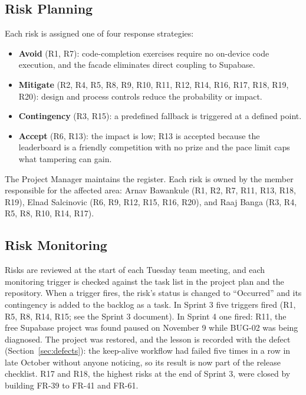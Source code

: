 \documentclass[12pt,letterpaper]{article}
\begin{document}
\subsection{Risk Planning}
Each risk is assigned one of four response strategies:
\begin{itemize}
  \item \textbf{Avoid} (R1, R7): code-completion exercises require no on-device code
        execution, and the facade eliminates direct coupling to Supabase.
  \item \textbf{Mitigate} (R2, R4, R5, R8, R9, R10, R11, R12, R14, R16, R17, R18, R19,
        R20): design and process controls reduce the probability or impact.
  \item \textbf{Contingency} (R3, R15): a predefined fallback is triggered at a
        defined point.
  \item \textbf{Accept} (R6, R13): the impact is low; R13 is accepted because the
        leaderboard is a friendly competition with no prize and the pace limit caps
        what tampering can gain.
\end{itemize}
The Project Manager maintains the register. Each risk is owned by the member
responsible for the affected area: Arnav Bawankule (R1, R2, R7, R11, R13, R18, R19), Elnad
Salcinovic (R6, R9, R12, R15, R16, R20), and Raaj Banga (R3, R4, R5, R8, R10, R14, R17).

\subsection{Risk Monitoring}
Risks are reviewed at the start of each Tuesday team meeting, and each monitoring
trigger is checked against the task list in the project plan and the repository. When a trigger fires, the risk's
status is changed to ``Occurred'' and its contingency is added to the backlog as a
task. In Sprint 3 five triggers fired (R1, R5, R8, R14, R15; see the Sprint 3
document). In Sprint 4 one fired: R11, the free Supabase project was found paused on
November 9 while BUG-02 was being diagnosed. The project was restored, and the lesson
is recorded with the defect (Section~\ref{sec:defects}): the keep-alive workflow had
failed five times in a row in late October without anyone noticing, so its result is
now part of the release checklist. R17 and R18, the highest risks at the end of
Sprint 3, were closed by building FR-39 to FR-41 and FR-61.

\end{document}
